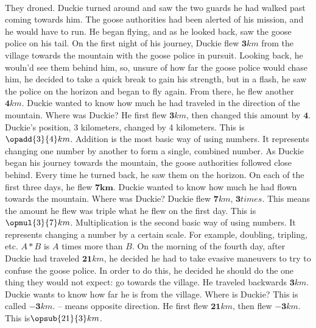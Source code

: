 \paragraph{} They droned. Duckie turned around and saw the two guards he had walked past coming towards him. The goose authorities had been alerted of his mission, and he would have to run. He began flying, and as he looked back, saw the goose police on his tail. 
\vfill
\pagebreak
{On the first night of his journey, Duckie flew $\mathbf{3} km$ from the village towards the mountain with the goose police in pursuit. Looking back, he wouln'd see them behind him, so, unsure of how far the goose police would chase him, he decided to take a quick break to gain his strength, but in a flash, he saw the police on the horizon and began to fly again. From there, he flew another $\mathbf{4} km$. Duckie wanted to know how much he had traveled in the direction of the mountain. Where was Duckie?}
{He first flew $\mathbf{3} km$, then changed this amount by $\mathbf{4}$. Duckie's position, 3 kilometers, changed by 4 kilometers. This is $\opadd{3}{4} km$.}
{Addition is the most basic way of using numbers. It represents changing one number by another to form a single, combined number.} 
{}
{As Duckie began his journey towards the mountain, the goose authorities followed close behind. Every time he turned back, he saw them on the horizon. On each of the first three days, he flew $\mathbf{7km}$. Duckie wanted to know how much he had flown towards the mountain. Where was Duckie?}
{Duckie flew $\mathbf{7} km$, $\mathbf{3} times$. This means the amount he flew was triple what he flew on the first day. This is $\opmul{3}{7} km$.}
{Multiplication is the second basic way of using numbers. It represents changing a number by a certain scale. For example, doubling, tripling, etc. $A\ast B$ is $A$ times more than $B$.}
{}
{On the morning of the fourth day, after Duckie had traveled $\mathbf{21} km$, he decided he had to take evasive maneuvers to try to confuse the goose police. In order to do this, he decided he should do the one thing they would not expect: go towards the village. He traveled backwards $\mathbf{3} km$. Duckie wants to know how far he is from the village. Where is Duckie?}
{This is called $\mathbf{-3} km$. \linebreak – means opposite direction.  He first flew $\mathbf{21} km$, then flew $\mathbf{-3} km$. This is$ \opsub{21}{3} km$.}
